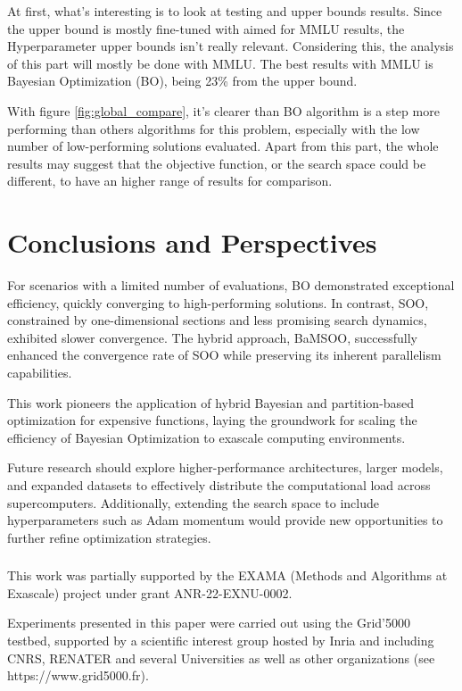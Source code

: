 \documentclass[runningheads]{llncs}
\begin{document}
At first, what's interesting is to look at testing and upper bounds results. Since the upper bound is mostly fine-tuned with aimed for MMLU results, the Hyperparameter upper bounds isn't really relevant. Considering this, the analysis of this part will mostly be done with MMLU. The best results with MMLU is Bayesian Optimization (BO), being 23\% from the upper bound.




With figure \ref{fig:global_compare}, it's clearer than BO algorithm is a step more performing than others algorithms for this problem, especially with the low number of low-performing solutions evaluated. Apart from this part, the whole results may suggest that the objective function, or the search space could be different, to have an higher range of results for comparison. 

\section{Conclusions and Perspectives}
\label{sec:conclusion}

For scenarios with a limited number of evaluations, BO demonstrated exceptional efficiency, quickly converging to high-performing solutions. In contrast, SOO, constrained by one-dimensional sections and less promising search dynamics, exhibited slower convergence. The hybrid approach, BaMSOO, successfully enhanced the convergence rate of SOO while preserving its inherent parallelism capabilities.

This work pioneers the application of hybrid Bayesian and partition-based optimization for expensive functions, laying the groundwork for scaling the efficiency of Bayesian Optimization to exascale computing environments.

Future research should explore higher-performance architectures, larger models, and expanded datasets to effectively distribute the computational load across supercomputers. Additionally, extending the search space to include hyperparameters such as Adam momentum would provide new opportunities to further refine optimization strategies.



\subsubsection{\ackname} 

This work was partially supported by the EXAMA (Methods and Algorithms at Exascale) project under grant ANR-22-EXNU-0002.

Experiments presented in this paper were carried out using the Grid'5000 testbed, supported by a scientific interest group hosted by Inria and including CNRS, RENATER and several Universities as well as other organizations (see https://www.grid5000.fr).



% 
% 
\printbibliography
\end{document}

